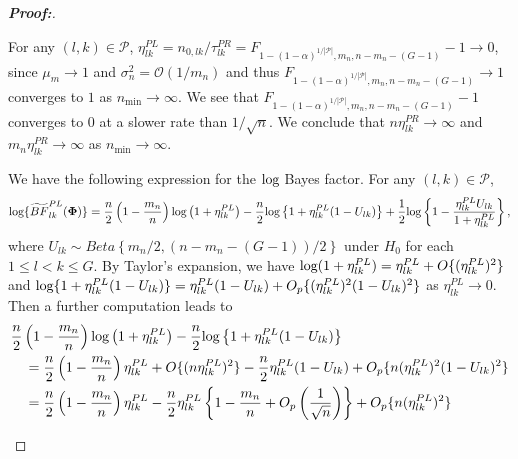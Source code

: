 \documentclass[times,sort&compress,3p]{elsarticle}
\theoremstyle{plain}%
\theoremstyle{definition}
\def\log{\hbox{log}}
\def\log{\hbox{log}}
\def\be{\begin{eqnarray}}
\def\ee{\end{eqnarray}}
\newcommand{\uPhi}              {\mbox{\boldmath$\Phi$}}
\newcommand{\rsz}[1]{\textcolor{red}{#1}}
\begin{document}
\begin{proof}[\textbf{\upshape Proof:}]
\begin{description}
For any $(l, k)\in\mathcal{P}$, 
$\eta^{PL}_{lk} = n_{0,lk}/\tau^{PR}_{lk} = F_{1-(1-\alpha)^{1/|\mathcal{P}|},m_n, n-m_n-(G-1)} - 1 \rightarrow 0$, since $\mu_m \rightarrow 1$ and $\sigma^2_n = \mathcal{O}(1/m_n)$ and thus  $F_{1-(1-\alpha)^{1/|\mathcal{P}|},m_n, n-m_n-(G-1)} \rightarrow 1$ converges to $1$ as $n_{\min} \rightarrow \infty$. 
We see that $F_{1-(1-\alpha)^{1/|\mathcal{P}|}, m_n, n-m_n-(G-1)} -1 $ converges to 0 at a slower rate than $1/\sqrt{n}$. We conclude that $n\eta^{PR}_{lk} \rightarrow \infty$ and $m_{n}\eta^{PR}_{lk} \rightarrow \infty$ as $n_{\min} \rightarrow \infty.$

We have the following expression for the $\log$ Bayes factor. 
For any $(l, k)\in\mathcal{P}$,
\be
 \log\{\widetilde{BF}^{PL}_{lk}(\uPhi)\} =\frac{n}{2}\left( 1 - \frac{m_n}{n}\right)\log\left(1 + \eta^{PL}_{lk} \right) - \frac{n}{2}\log\left\{ 1 + \eta^{PL}_{lk}(1-U_{lk}) \right \} +\frac{1}{2}\log \left\{1 - \frac{\eta^{PL}_{lk} U_{lk}}{1+\eta^{PL}_{lk}}\right\},  \nonumber
\ee
where $U_{lk} \sim Beta\left\{ m_n/2,  (n - m_n -(G-1))/2 \right\}$ under $H_0$ for each $1 \leq l < k \leq G$.
{\color{black}
By Taylor's expansion, we have
$\log(1 + \eta_{lk}^{PL}) = \eta_{lk}^{PL} + O\{(\eta_{lk}^{PL})^2\}$ and $\log\{1 + \eta_{lk}^{PL}(1 - U_{lk})\} = \eta_{lk}^{PL}(1 - U_{lk}) + O_p\{(\eta_{lk}^{PL})^2(1 - U_{lk})^2\}$ as $\eta_{lk}^{PL}\to 0$. Then a further computation leads to
\begin{align*}
    &\frac{n}{2}\left( 1 - \frac{m_n}{n}\right)\log\left(1 + \eta^{PL}_{lk} \right) - \frac{n}{2}\log\left\{ 1 + \eta^{PL}_{lk}(1-U_{lk}) \right \}\\
    &\quad = \frac{n}{2}\left( 1 - \frac{m_n}{n}\right)\eta_{lk}^{PL} + O\{(n\eta_{lk}^{PL})^2\} - \frac{n}{2}\eta_{lk}^{PL}(1 - U_{lk}) + O_p\{n(\eta_{lk}^{PL})^2(1 - U_{lk})^2\}\\
    &\quad = \frac{n}{2}\left( 1 - \frac{m_n}{n}\right)\eta_{lk}^{PL} - \frac{n}{2}\eta_{lk}^{PL}\left\{1 - \frac{m_n}{n} + O_p\left(\frac{1}{\sqrt{n}}\right)\right\} + O_p\{n(\eta_{lk}^{PL})^2\}\\

\end{align*}}
\end{description}
\end{proof}
\end{document}

